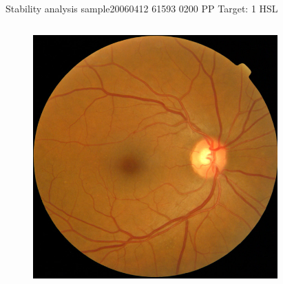 \documentclass{beamer}
\begin{document}
\begin{frame}{Stability analysis sample}{20060412 61593 0200 PP Target: 1 HSL}
\begin{columns}
\begin{column}{0.3\textwidth}
\begin{figure}[p]
\centering
\includegraphics[width=\textwidth]{chapter_stability/20060412_61593_0200_PP/20060412_61593_0200_PP.jpeg}
\end{figure}	
\end{column}
\begin{column}{0.45\textwidth}  %
\begin{figure}[p]
\centering

\end{figure}
\end{column}
\end{columns}
\end{frame}
\end{document}
